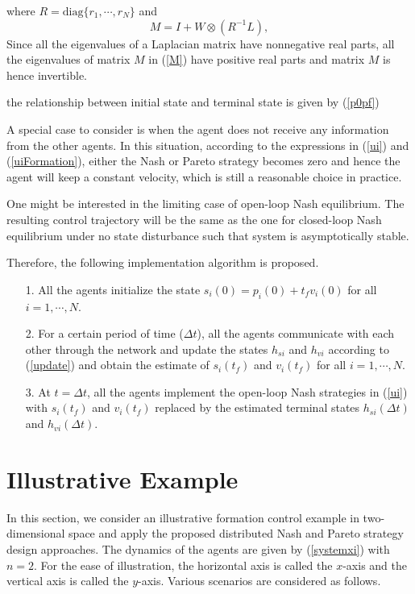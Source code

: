 \documentclass[12pt,draftcls,onecolumn]{IEEEtran}  %
\begin{document}
where $R=\mbox{diag}\{r_1,\cdots,r_N\}$ and
\begin{equation}
M=I+W\otimes (R^{-1}L),\label{M}
\end{equation}
Since all the eigenvalues of a Laplacian matrix have nonnegative real parts, all the eigenvalues of matrix $M$ in (\ref{M}) have positive real parts and matrix $M$ is hence invertible.

the relationship between initial state and terminal state is given by (\ref{p0pf})






{A special case to consider is when the agent does not receive any information from the other agents. In this situation, according to the expressions in (\ref{ui}) and (\ref{uiFormation}), either the Nash or Pareto strategy becomes zero and hence the agent will keep a constant velocity, which is still a reasonable choice in practice.}


\begin{Rmk}
One might be interested in the limiting case of open-loop Nash equilibrium. The resulting control trajectory will be the same as the one for closed-loop Nash equilibrium under no state disturbance such that system is asymptotically stable.
\end{Rmk}

Therefore, the following implementation algorithm is proposed.
\begin{Alg}\label{Alg}
\quad
\begin{itemize}
\item[1.] All the agents initialize the state {$s_{i}(0)=p_i(0)+t_fv_i(0)$} for all $i=1,\cdots,N$.
\item[2.] For a certain period of time ($\Delta t$), all the agents communicate with each other through the network and update the states $h_{si}$ and $h_{vi}$ according to (\ref{update}) and obtain the estimate of $s_{i}(t_f)$ and $v_i(t_f)$ for all $i=1,\cdots,N$.
\item[3.] At $t=\Delta t$, all the agents implement the {open-loop Nash} strategies in (\ref{ui}) with $s_i(t_f)$ and $v_i(t_f)$ replaced by the estimated terminal states $h_{si}(\Delta t)$ and $h_{vi}(\Delta t)$.
\end{itemize}
\end{Alg}


\section{Illustrative Example}\label{simulation}
In this section, we consider an illustrative formation control example in two-dimensional space and apply the proposed distributed Nash and Pareto strategy design approaches. The dynamics of the agents are given by (\ref{systemxi}) with $n=2$. For the ease of illustration, the horizontal axis is called the $x$-axis and the vertical axis is called the $y$-axis. Various scenarios are considered as follows.
\end{document}

